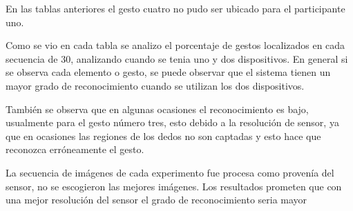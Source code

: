 En las tablas anteriores el gesto cuatro no pudo ser ubicado para el participante uno. 

Como se vio en cada tabla se analizo el porcentaje de gestos localizados en cada secuencia de $30$, analizando cuando se tenia uno y dos dispositivos. En general si se observa cada elemento o gesto, se puede observar que el sistema tienen un mayor grado de reconocimiento cuando se utilizan los dos dispositivos.    

También se observa que en algunas ocasiones el reconocimiento es bajo, usualmente para el gesto n\'umero tres, esto debido a la resolución de sensor, ya que en ocasiones las regiones de los dedos no son captadas y esto hace que reconozca erróneamente el gesto. 

La secuencia de imágenes de cada experimento fue procesa como provenía del sensor, no se escogieron las mejores imágenes. Los resultados prometen que con una mejor resolución del sensor el grado de reconocimiento seria mayor

\newpage